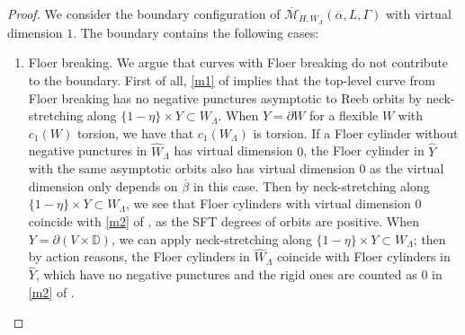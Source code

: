 \documentclass[reqno,11pt]{amsart}
\numberwithin{equation}{section}
\def\D{{\mathbb D}}
\def\cM{{\mathcal M}}
\begin{document}
\begin{proof}
    We consider the boundary configuration of $\overline{\cM}_{H,W_{\Lambda}}(\overline{\alpha},L,\Gamma)$ with virtual dimension $1$. The boundary contains the following cases:
    \begin{enumerate}
        \item\label{t1} Floer breaking. We argue that curves with Floer breaking do not contribute to the boundary. First of all, \eqref{m1} of  implies that the top-level curve from Floer breaking has no negative punctures asymptotic to Reeb orbits by neck-stretching along $\{1-\eta\}\times Y \subset W_{\Lambda}$. When $Y=\partial W$ for a flexible $W$ with $c_1(W)$ torsion, we have that $c_1(W_{\Lambda})$ is torsion. If a Floer cylinder without negative punctures in $\widehat{W}_{\Lambda}$ has virtual dimension $0$, the Floer cylinder in $\widehat{Y}$ with the same asymptotic orbits also has virtual dimension $0$ as the virtual dimension only depends on $\overline{\beta}$ in this case. Then by neck-stretching along $\{1-\eta\}\times Y \subset W_{\Lambda}$, we see that Floer cylinders with virtual dimension $0$ coincide with \eqref{m2} of , as the SFT degrees of orbits are positive. When $Y=\partial(V\times \D)$, we can apply neck-stretching along $\{1-\eta\}\times Y \subset W_{\Lambda}$; then by action reasons, the Floer cylinders in $\widehat{W}_{\Lambda}$ coincide with Floer cylinders in $\widehat{Y}$, which have no negative punctures and the rigid ones are counted as $0$ in \eqref{m2} of .
            \begin{figure}[H]
    \centering
\end{figure}
\end{enumerate}
\end{proof}
\end{document}
